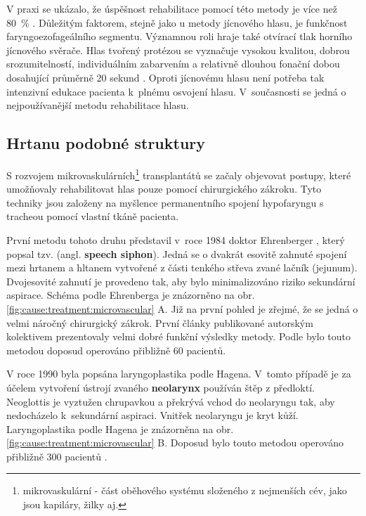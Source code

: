 V praxi se ukázalo, že úspěšnost rehabilitace pomocí této metody je více než 80~\%
\cite{Slavicek2002}. Důležitým faktorem, stejně jako u metody jícnového hlasu, je
funkčnost faryngoezofageálního segmentu. Významnou roli hraje také otvírací tlak horního
jícnového svěrače. Hlas tvořený protézou se vyznačuje vysokou kvalitou, dobrou
srozumitelností, individuálním zabarvením a relativně dlouhou fonační dobou
dosahující průměrně 20 sekund \cite{Saito2003}. Oproti jícnovému hlasu není potřeba
tak intenzivní edukace pacienta k~plnému osvojení hlasu. V~současnosti se
jedná o nejpoužívanější metodu rehabilitace hlasu.


\subsection{Hrtanu podobné struktury} %
\label{chap:cause:tratment:structure}

S rozvojem mikrovaskulárních\footnote{mikrovaskulární - část oběhového systému
složeného z nejmenších cév, jako jsou kapiláry, žilky aj.} transplantátů se
začaly objevovat postupy, které umožňovaly rehabilitovat hlas pouze pomocí
chirurgického zákroku. Tyto techniky jsou založeny na myšlence permanentního spojení hypofaryngu
s tracheou pomocí vlastní tkáně pacienta.

První metodu tohoto druhu představil v~roce 1984 doktor Ehrenberger
\cite{Kramp2009}, který popsal tzv. 
(angl. \textbf{speech siphon}). Jedná se o dvakrát esovitě zahnuté spojení mezi hrtanem a hltanem
vytvořené z části tenkého střeva zvané lačník (jejunum). Dvojesovité zahnutí je provedeno tak, aby
bylo minimalizováno riziko sekundární aspirace. Schéma 
podle Ehrenberga je znázorněno na obr. \ref{fig:cause:treatment:microvascular}
A. Již na první pohled je zřejmé, že se jedná o velmi náročný chirurgický
zákrok. První články publikované autorským kolektivem prezentovaly velmi dobré
funkční výsledky metody. Podle \cite {Sebova-Sedenkova2006} bylo touto metodou doposud
operováno přibližně 60 pacientů.

V roce 1990 byla popsána laryngoplastika podle Hagena. V~tomto případě je za účelem vytvoření ústrojí zvaného \textbf{neolarynx} používán štěp z předloktí. Neoglottis je vyztužen chrupavkou
a překrývá vchod do neolaryngu tak, aby nedocházelo  k~sekundární aspiraci. Vnitřek neolaryngu je kryt kůží.
Laryngoplastika podle Hagena je znázorněna na obr.
\ref{fig:cause:treatment:microvascular} B. Doposud bylo touto metodou operováno přibližně 300
pacientů \cite{Sebova-Sedenkova2006}.

